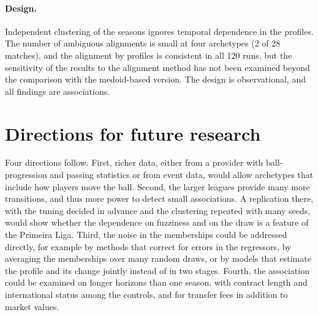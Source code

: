 \paragraph{Design.} Independent clustering of the seasons ignores temporal dependence in the profiles. The number of ambiguous alignments is small at four archetypes (2 of 28 matches), and the alignment by profiles is consistent in all 120 runs, but the sensitivity of the results to the alignment method has not been examined beyond the comparison with the medoid-based version. The design is observational, and all findings are associations.

\section{Directions for future research}
\label{sec:disc-future}

Four directions follow. First, richer data, either from a provider with ball-progression and passing statistics or from event data, would allow archetypes that include how players move the ball. Second, the larger leagues provide many more transitions, and thus more power to detect small associations. A replication there, with the tuning decided in advance and the clustering repeated with many seeds, would show whether the dependence on fuzziness and on the draw is a feature of the Primeira Liga. Third, the noise in the memberships could be addressed directly, for example by methods that correct for errors in the regressors, by averaging the memberships over many random draws, or by models that estimate the profile and its change jointly instead of in two stages. Fourth, the association could be examined on longer horizons than one season, with contract length and international status among the controls, and for transfer fees in addition to market values.
